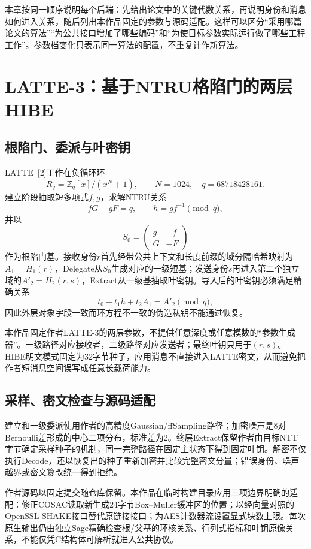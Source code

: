 \documentclass[UTF8,a4paper,12pt,oneside,openany,fontset=fandol]{ctexrep}
\begin{document}
本章按同一顺序说明每个后端：先给出论文中的关键代数关系，再说明身份和消息如何进入关系，随后列出本作品固定的参数与源码适配。这样可以区分“采用哪篇论文的算法”“为公共接口增加了哪些编码”和“为使目标参数实际运行做了哪些工程工作”。参数档变化只表示同一算法的配置，不重复计作新算法。

\section{LATTE-3：基于NTRU格陷门的两层HIBE}
\subsection{根陷门、委派与叶密钥}
LATTE~[2]工作在负循环环
\[
  R_q=\mathbb Z_q[x]/(x^N+1),\qquad N=1024,
  \quad q=68718428161.
\]
建立阶段抽取短多项式$f,g$，求解NTRU关系
\[
  fG-gF=q,
  \qquad h=g f^{-1}\pmod q,
\]
并以
\[
  S_0=\begin{pmatrix}g&-f\\G&-F\end{pmatrix}
\]
作为根陷门基。接收身份$r$首先经带公共上下文和长度前缀的域分隔哈希映射为$A_1=H_1(r)$，Delegate从$S_0$生成对应的一级短基；发送身份$s$再进入第二个独立域的$A'_2=H_2(r,s)$，Extract从一级基抽取叶密钥。导入后的叶密钥必须满足精确关系
\[
  t_0+t_1h+t_2A_1=A'_2\pmod q,
\]
因此外层对象字段一致而环方程不一致的伪造私钥不能通过恢复。

本作品固定作者LATTE-3的两层参数，不提供任意深度或任意模数的“参数生成器”。一级路径对应接收者，二级路径对应发送者；最终叶钥只用于$(r,s)$。HIBE明文模式固定为32字节种子，应用消息不直接进入LATTE密文，从而避免把作者短消息空间误写成任意长载荷能力。

\subsection{采样、密文检查与源码适配}
建立和一级委派使用作者的高精度Gaussian/ffSampling路径；加密噪声是8对Bernoulli差形成的中心二项分布，标准差为2。终层Extract保留作者由目标NTT字节确定采样种子的机制，同一完整路径在固定主状态下得到固定叶钥。解密不仅执行Decode，还以恢复出的种子重新加密并比较完整密文分量；错误身份、噪声越界或密文篡改统一得到拒绝。

作者源码以固定提交随仓库保留。本作品在临时构建目录应用三项边界明确的适配：修正COSAC读取新生成24字节Box--Muller缓冲区的位置；以经向量对照的OpenSSL SHAKE接口替代原链接接口；为AES计数器流设置显式块数上限。每次原生输出仍由独立Sage精确检查根/父基的环核关系、行列式指标和叶钥原像关系，不能仅凭C结构体可解析就进入公共协议。
\end{document}

